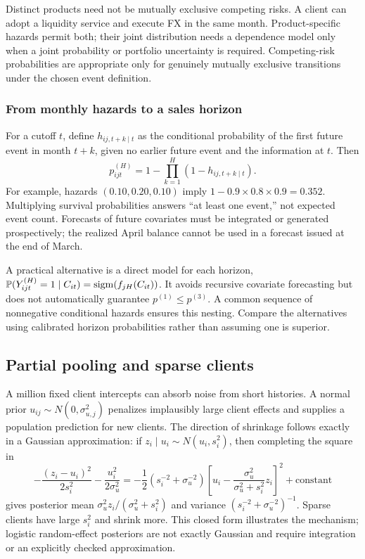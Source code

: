 Distinct products need not be mutually exclusive competing risks. A client can adopt a liquidity service and execute FX in the same month. Product-specific hazards permit both; their joint distribution needs a dependence model only when a joint probability or portfolio uncertainty is required. Competing-risk probabilities are appropriate only for genuinely mutually exclusive transitions under the chosen event definition.

\subsubsection{From monthly hazards to a sales horizon}

For a cutoff $t$, define $h_{ij,t+k\mid t}$ as the conditional probability of the first future event in month $t+k$, given no earlier future event and the information at $t$. Then
\begin{equation}
 p_{ijt}^{(H)}=1-\prod_{k=1}^{H}(1-h_{ij,t+k\mid t}).
 \label{eq:horizon-hazard}
\end{equation}
For example, hazards $(0.10,0.20,0.10)$ imply $1-0.9\times0.8\times0.9=0.352$. Multiplying survival probabilities answers ``at least one event,'' not expected event count. Forecasts of future covariates must be integrated or generated prospectively; the realized April balance cannot be used in a forecast issued at the end of March.

A practical alternative is a direct model for each horizon, $\mathbb{P}(Y_{ijt}^{(H)}=1\mid C_{it})=\operatorname{sigm}(f_{jH}(C_{it}))$. It avoids recursive covariate forecasting but does not automatically guarantee $p^{(1)}\le p^{(3)}$. A common sequence of nonnegative conditional hazards ensures this nesting. Compare the alternatives using calibrated horizon probabilities rather than assuming one is superior.

\subsection{Partial pooling and sparse clients}

A million fixed client intercepts can absorb noise from short histories. A normal prior $u_{ij}\sim N(0,\sigma_{u,j}^2)$ penalizes implausibly large client effects and supplies a population prediction for new clients. The direction of shrinkage follows exactly in a Gaussian approximation: if $z_i\mid u_i\sim N(u_i,s_i^2)$, then completing the square in
\[
 -\frac{(z_i-u_i)^2}{2s_i^2}-\frac{u_i^2}{2\sigma_u^2}
 =-\frac12(s_i^{-2}+\sigma_u^{-2})
 \left[u_i-\frac{\sigma_u^2}{\sigma_u^2+s_i^2}z_i\right]^2+\text{constant}
\]
gives posterior mean $\sigma_u^2z_i/(\sigma_u^2+s_i^2)$ and variance $(s_i^{-2}+\sigma_u^{-2})^{-1}$. Sparse clients have large $s_i^2$ and shrink more. This closed form illustrates the mechanism; logistic random-effect posteriors are not exactly Gaussian and require integration or an explicitly checked approximation.

